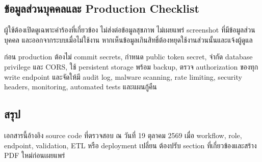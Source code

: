 \subsection{ข้อมูลส่วนบุคคลและ Production Checklist}
ผู้ใช้ต้องเปิดดูเฉพาะคำร้องที่เกี่ยวข้อง ไม่ส่งต่อข้อมูลสุขภาพ ไม่เผยแพร่ screenshot ที่มีข้อมูลส่วนบุคคล และออกจากระบบเมื่อไม่ใช้งาน หากเห็นข้อมูลเกินสิทธิ์ต้องหยุดใช้งานส่วนนั้นและแจ้งผู้ดูแล

ก่อน production ต้องไม่ commit secrets, กำหนด public token secret, จำกัด database privilege และ CORS, ใช้ persistent storage พร้อม backup, ตรวจ authorization ของทุก write endpoint และจัดให้มี audit log, malware scanning, rate limiting, security headers, monitoring, automated tests และแผนกู้คืน

\subsection{สรุป}
เอกสารนี้อ้างอิง source code ที่ตรวจสอบ ณ วันที่ 19 ตุลาคม 2569 เมื่อ workflow, role, endpoint, validation, ETL หรือ deployment เปลี่ยน ต้องปรับ section ที่เกี่ยวข้องและสร้าง PDF ใหม่ก่อนเผยแพร่

